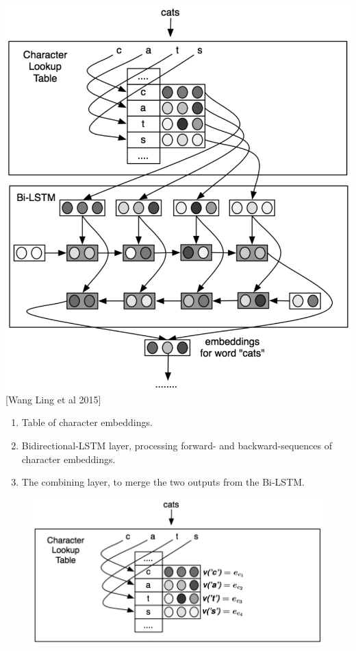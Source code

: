 \documentclass[11pt, a4paper, landscape]{article}
\begin{document}
\begin{minipage}[c]{.5\linewidth}
  \begin{center}
    \includegraphics[width=\linewidth]{../article/img/bi-lstm-emeddings}\\
    {[}Wang Ling et al 2015{]}
  \end{center}
\end{minipage}
\begin{minipage}[c]{.5\linewidth}
  \begin{enumerate}
  \item Table of character embeddings.
  \item Bidirectional-LSTM layer, processing forward- and backward-sequences of character embeddings.
  \item The combining layer, to merge the two outputs from the Bi-LSTM.
  \end{enumerate}
\end{minipage}


\NewPage{}

\begin{figure}[H]
\begin{center}
  \includegraphics[width=.5\textwidth]{../article/img/character-lookup}
\end{center}
\end{figure}
\end{document}
